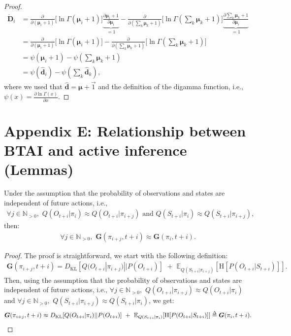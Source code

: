 \documentclass[twoside,11pt]{article}
\def\delequal{\mathrel{\ensurestackMath{\stackon[1pt]{=}{\scriptstyle\Delta}}}}
\begin{document}
\begin{proof}
\begin{align}
\bm{\mathring{D}}_i &= \frac{\partial}{\partial (\bm{\mu}_i + 1)}\bigg[ \ln \Gamma(\bm{\mu}_i + 1)\bigg] \underbrace{\frac{\partial \bm{\mu}_i + 1}{\partial \bm{\mu}_i}}_{=1} - \frac{\partial}{\partial ({\textstyle \sum_k \bm{\mu}_k + 1})}\bigg[\ln \Gamma({\textstyle \sum_k \bm{\mu}_k + 1})\bigg]\underbrace{\frac{\partial {\textstyle \sum_k \bm{\mu}_k + 1}}{\partial \bm{\mu}_i}}_{=1}\\
&= \frac{\partial}{\partial (\bm{\mu}_i + 1)}\bigg[ \ln \Gamma(\bm{\mu}_i + 1)\bigg] - \frac{\partial}{\partial ({\textstyle \sum_k \bm{\mu}_k + 1})}\bigg[\ln \Gamma({\textstyle \sum_k \bm{\mu}_k + 1})\bigg]\\
&= \psi(\bm{\mu}_i + 1) - \psi({\textstyle \sum_k \bm{\mu}_k + 1})\\
&= \psi(\bm{\hat{d}}_i) - \psi({\textstyle \sum_k \bm{\hat{d}}_k}),
\end{align}
where we used that $\bm{\hat{d}} = \bm{\mu} + \vec{1}$ and the definition of the digamma function, i.e., $\psi(x) = \frac{\partial \ln \Gamma(x)}{\partial x}$.
\end{proof}

\section*{Appendix E: Relationship between BTAI and active inference (Lemmas)}

\begin{lemma}\label{lemma_51}
Under the assumption that the probability of observations and states are independent of future actions, i.e.,
\begin{align}
\forall j \in \mathbb{N}_{>0}, \,\, Q(O_{t+i}|\pi_{i}) \approx Q(O_{t+i}|\pi_{i+j}) \text{ and } Q(S_{t+i}|\pi_{i}) \approx Q(S_{t+i}|\pi_{i+j}),
\end{align}
then:
\begin{align}
\forall j \in \mathbb{N}_{>0},\,\, \bm{G}(\pi_{i+j}, t+i) \approx \bm{G}(\pi_i, t+i).
\end{align}
\end{lemma}

\begin{proof}
The proof is straightforward, we start with the following definition:
\begin{align}
\bm{G}(\pi_{i+j}, t+i) = D_{\mathrm{KL}}[Q(O_{t+i}|\pi_{i+j})||P(O_{t+i})]\,\, +\,\, \mathbb{E}_{Q(S_{t+i}|\pi_{i+j})}[\text{H}[P(O_{t+i}| S_{t+i})]].
\end{align}
Then, using the assumption that the probability of observations and states are independent of future actions, i.e., $\forall j \in \mathbb{N}_{>0},\,\, Q(O_{t+i}|\pi_{i+j}) \approx Q(O_{t+i}|\pi_{i})$ and $\forall j \in \mathbb{N}_{>0},\,\, Q(S_{t+i}|\pi_{i+j}) \approx Q(S_{t+i}|\pi_i)$, we get:
\begin{align}
\bm{G}(\pi_{i+j}, t+i) \approx D_{\mathrm{KL}}[Q(O_{t+i}|\pi_i)||P(O_{t+i})]\,\, +\,\, \mathbb{E}_{Q(S_{t+i}|\pi_i)}[\text{H}[P(O_{t+i}| S_{t+i})]] \delequal \bm{G}(\pi_i, t+i).
\end{align}
\end{proof}
\end{document}
